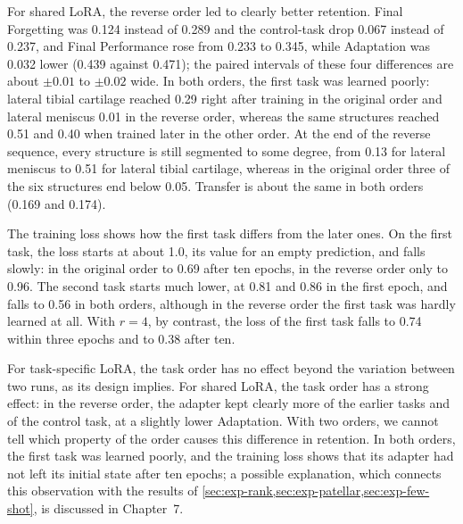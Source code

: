 For shared LoRA, the reverse order led to clearly better retention.
Final Forgetting was 0.124 instead of 0.289 and the control-task drop 0.067 instead of 0.237, and Final Performance rose from 0.233 to 0.345, while Adaptation was 0.032 lower (0.439 against 0.471); the paired intervals of these four differences are about $\pm 0.01$ to $\pm 0.02$ wide.
In both orders, the first task was learned poorly: lateral tibial cartilage reached 0.29 right after training in the original order and lateral meniscus 0.01 in the reverse order, whereas the same structures reached 0.51 and 0.40 when trained later in the other order.
At the end of the reverse sequence, every structure is still segmented to some degree, from 0.13 for lateral meniscus to 0.51 for lateral tibial cartilage, whereas in the original order three of the six structures end below 0.05.
Transfer is about the same in both orders (0.169 and 0.174).

The training loss shows how the first task differs from the later ones.
On the first task, the loss starts at about 1.0, its value for an empty prediction, and falls slowly: in the original order to 0.69 after ten epochs, in the reverse order only to 0.96.
The second task starts much lower, at 0.81 and 0.86 in the first epoch, and falls to 0.56 in both orders, although in the reverse order the first task was hardly learned at all.
With $r = 4$, by contrast, the loss of the first task falls to 0.74 within three epochs and to 0.38 after ten.

For task-specific LoRA, the task order has no effect beyond the variation between two runs, as its design implies.
For shared LoRA, the task order has a strong effect: in the reverse order, the adapter kept clearly more of the earlier tasks and of the control task, at a slightly lower Adaptation.
With two orders, we cannot tell which property of the order causes this difference in retention.
In both orders, the first task was learned poorly, and the training loss shows that its adapter had not left its initial state after ten epochs; a possible explanation, which connects this observation with the results of \cref{sec:exp-rank,sec:exp-patellar,sec:exp-few-shot}, is discussed in Chapter~7.


